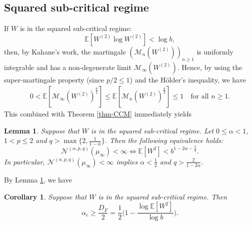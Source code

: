 \documentclass[12pt]{amsart}
\newtheorem{lemma}[theorem]{Lemma}
\newtheorem{corollary}[theorem]{Corollary}
\theoremstyle{definition}
\theoremstyle{remark}
\newcommand{\E}{\mathbb{E}}
\newcommand{\MAB}{\mathscr{M}_{n}(W^{(2)})}
\newcommand{\NQ}{\mathcal{N}^{(\alpha, p, q)}}
\numberwithin{equation}{section}
\begin{document}

\subsection{Squared sub-critical regime}\label{sec-sq-sub}

If $W$ is in the squared sub-critical regime:
\[
\E[W^{(2)}\log W^{(2)}]<\log b,
\]
then, by Kahane's work, the martingale $(\MAB)_{n\ge 1}$ is uniformly integrable and has a non-degenerate limit $\mathscr{M}_\infty(W^{(2)})$.  Hence, by using the super-martingale property (since $p/2\le 1$) and the H\"older's inequality, we have 
\begin{align*}
0<  \E[\mathscr{M}_\infty(W^{(2)})^{\frac{p}{2}}]  \le  \E[\MAB^{\frac{p}{2}}]\le 1 \quad \text{for all $n\ge 1$}. 
\end{align*}
This combined with Theorem \ref{thm-CCM} immediately yields 

\begin{lemma}\label{prop-sub}
Suppose that $W$ is in the  squared sub-critical regime. 
Let $0\le \alpha<1$, $1< p\le 2$ and $q> \max\{2, \frac{1}{1 - \alpha}\}$.   Then the following equivalence holds:
\[
\NQ(\mu_\infty)<\infty \Longleftrightarrow 
 \E[W^2] < b^{1- 2\alpha- \frac{2}{q}}. 
\]
In particular,  $\NQ(\mu_\infty)<\infty$ implies $\alpha<\frac{1}{2}$ and  $q> \frac{2}{1- 2\alpha}$.
\end{lemma}


By Lemma \ref{prop-sub}, we have
\begin{corollary}\label{cor-sqsub}
Suppose that $W$ is in the  squared sub-critical regime. Then
\[
\alpha_{c}\geq \frac{D_F}{2}=\frac{1}{2}\Big(1 - \frac{\log \E[W^2]}{\log b}\Big).
\]
\end{corollary}
\end{document}
